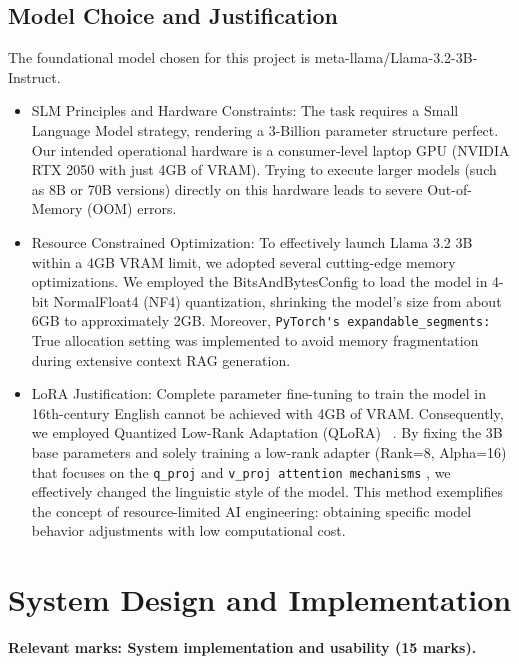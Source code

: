 \documentclass[10pt,conference]{IEEEtran}
\begin{document}
\subsection{Model Choice and Justification}

The foundational model chosen for this project is meta-llama/Llama-3.2-3B-Instruct.

\begin{itemize}
 \item SLM Principles and Hardware Constraints: The task requires a Small Language Model strategy, rendering a 3-Billion parameter structure perfect. Our intended operational hardware is a consumer-level laptop GPU (NVIDIA RTX 2050 with just 4GB of VRAM). Trying to execute larger models (such as 8B or 70B versions) directly on this hardware leads to severe Out-of-Memory (OOM) errors.

 \item Resource Constrained Optimization: To effectively launch Llama 3.2 3B 
 within a 4GB VRAM limit, we adopted several cutting-edge memory 
 optimizations. We employed the BitsAndBytesConfig to load the model in 4-
 bit NormalFloat4 (NF4) quantization, shrinking the model's size from about 
 6GB to approximately 2GB. Moreover, 
\verb|PyTorch's expandable_segments:|
True allocation setting was implemented to avoid memory fragmentation during 
 extensive context RAG generation.

 \item LoRA Justification: Complete parameter fine-tuning to train the model
 in 16th-century English cannot be achieved with 4GB of VRAM. Consequently, 
 we employed Quantized Low-Rank Adaptation (QLoRA) ~\cite{dettmers2023qlora}. By fixing the 3B 
 base parameters and solely training a low-rank adapter (Rank=8, Alpha=16) 
 that focuses on the
 \verb|q_proj|
 and 
  \verb|v_proj attention mechanisms|
 , we effectively changed the linguistic style of the model. This method exemplifies 
 the concept of resource-limited AI engineering: obtaining specific model behavior 
 adjustments with low computational cost.
\end{itemize}


\section{System Design and Implementation}
\label{sec:system}

\textbf{Relevant marks: System implementation and usability (15 marks).}
\end{document}
